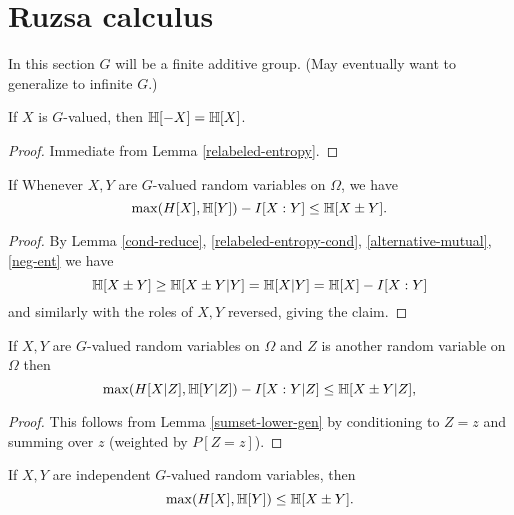 \chapter{Ruzsa calculus}

In this section $G$ will be a finite additive group.  (May eventually want to generalize to infinite $G$.)

\begin{lemma}\label{neg-ent}
  \leanok
  If $X$ is $G$-valued, then $\mathbb{H}[-X]=\mathbb{H}[X]$.
\end{lemma}

\begin{proof}
  \leanok Immediate from Lemma \ref{relabeled-entropy}.
\end{proof}

\begin{lemma}\label{sumset-lower-gen}
  \leanok
  If
Whenever $X,Y$ are $G$-valued random variables on $\Omega$, we have
$$ \max(H[X], \mathbb{H}[Y]) - I[X:Y] \leq \mathbb{H}[X \pm Y].$$
\end{lemma}

\begin{proof}   By Lemma \ref{cond-reduce}, \ref{relabeled-entropy-cond}, \ref{alternative-mutual}, \ref{neg-ent} we have
$$
 \mathbb{H}[X\pm Y] \geq \mathbb{H}[X\pm Y|Y] = \mathbb{H}[X|Y]= \mathbb{H}[X] - I[X:Y]
$$
and similarly with the roles of $X,Y$ reversed, giving the claim.
\end{proof}

\begin{corollary}\label{sumset-lower-gen-cond}
  \leanok
  If $X,Y$ are $G$-valued random variables on $\Omega$ and $Z$ is another random variable on $\Omega$ then
\[
  \max(H[X|Z], \mathbb{H}[Y|Z]) - I[X:Y|Z] \leq \mathbb{H}[X\pm Y|Z],
\]
\end{corollary}

\begin{proof}  This follows from Lemma \ref{sumset-lower-gen} by conditioning to $Z = z$ and summing over $z$ (weighted by $P[Z=z]$).
\end{proof}

\begin{corollary}\label{sumset-lower}
  \leanok
  If $X,Y$ are independent $G$-valued random variables, then
$$\max(H[X], \mathbb{H}[Y]) \leq \mathbb{H}[X\pm Y].
$$
\end{corollary}

